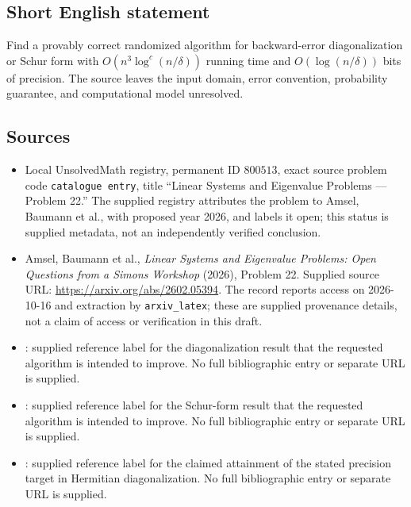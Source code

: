 \documentclass[11pt]{article}
\begin{document}
\subsection{Short English statement}
Find a provably correct randomized algorithm for backward-error diagonalization or Schur form with \(O(n^3\log^c(n/\delta))\) running time and \(O(\log(n/\delta))\) bits of precision. The source leaves the input domain, error convention, probability guarantee, and computational model unresolved.
\subsection{Sources}
\begin{itemize}
\item Local UnsolvedMath registry, permanent ID \(800513\), exact source problem code \texttt{catalogue entry}, title ``Linear Systems and Eigenvalue Problems --- Problem 22.'' The supplied registry attributes the problem to Amsel, Baumann et al., with proposed year 2026, and labels it open; this status is supplied metadata, not an independently verified conclusion.
\item Amsel, Baumann et al., \emph{Linear Systems and Eigenvalue Problems: Open Questions from a Simons Workshop} (2026), Problem 22. Supplied source URL: \url{https://arxiv.org/abs/2602.05394}. The record reports access on 2026-10-16 and extraction by \texttt{arxiv\_latex}; these are supplied provenance details, not a claim of access or verification in this draft.
\item [Banks-et-al-23]: supplied reference label for the diagonalization result that the requested algorithm is intended to improve. No full bibliographic entry or separate URL is supplied.
\item [banks2022global]: supplied reference label for the Schur-form result that the requested algorithm is intended to improve. No full bibliographic entry or separate URL is supplied.
\item [shah2025hermitian]: supplied reference label for the claimed attainment of the stated precision target in Hermitian diagonalization. No full bibliographic entry or separate URL is supplied.
\end{itemize}
\end{document}
